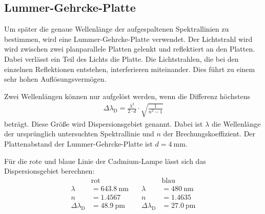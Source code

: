 \subsection{Lummer-Gehrcke-Platte}
Um später die genaue Wellenlänge der aufgespaltenen Spektrallinien zu bestimmen, wird eine Lummer-Gehrcke-Platte verwendet.
Der Lichtstrahl wird wird zwischen zwei planparallele Platten gelenkt und reflektiert an den Platten.
Dabei verlässt ein Teil des Lichts die Platte.
Die Lichtstrahlen, die bei den einzelnen Reflektionen entstehen, interferieren miteinander.
Dies führt zu einem sehr hohen Auflösungsvermögen.

Zwei Wellenlängen können nur aufgelöst werden, wenn die Differenz höchstens
\begin{align}
	\Delta \lambda_\text{D} = \frac{\lambda^2}{2 \cdot d} \cdot \sqrt{\frac{1}{n^2 - 1}}
	\label{dispersionsgebiet}
\end{align}
beträgt.
Diese Größe wird Dispersionsgebiet genannt.
Dabei ist $\lambda$ die Wellenlänge der ursprünglich untersuchten Spektrallinie und $n$ der Brechungskoeffizient.
Der Plattenabstand der Lummer-Gehrcke-Platte ist $d = \SI{4}{\milli \meter}$.

Für die rote und blaue Linie der Cadmium-Lampe lässt sich das Dispersionsgebiet berechnen:
\begin{align}
	&\text{rot} & \quad &\text{blau} \\
	\lambda &= \SI{643.8}{\nano \meter} & \quad \lambda &= \SI{480}{\nano \meter} \\
	n &=  \SI{1.4567}{} & \quad n &= \SI{1.4635}{} \\
	\Delta \lambda_\text{D} &= \SI{48.9}{\pico \meter} & \quad \Delta \lambda_\text{D} &= \SI{27.0}{\pico \meter}
\end{align}

